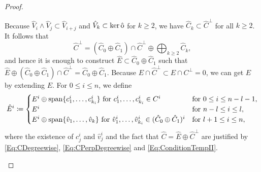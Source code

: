 \documentclass[\MainFolder/Text.tex]{subfiles}
\begin{document}
\begin{proof}
\begin{description}[leftmargin=0pt,font=\normalfont\itshape]
\item[Construction of $\hat{E}$:]
Because $\hat{V}_i \wedge \hat{V}_j \subset \hat{V}_{i+j}$ and $\hat{V}_k \subset \ker \hat{\mathrm{o}}$ for $k\ge 2$, we have $\hat{C}_k \subset \hat{C}^\perp$ for all $k\ge 2$.
It follows that 
\[
\hat{C}^\perp = (\hat{C}_0\oplus\hat{C}_1)\cap\hat{C}^\perp \oplus \bigoplus_{k\ge 2}\hat{C}_k,
\]
and hence it is enough to construct $\hat{E} \subset \hat{C}_0\oplus\hat{C}_1$ such that $\hat{E}\oplus (\hat{C}_0\oplus\hat{C}_1)\cap\hat{C}^\perp = \hat{C}_0\oplus\hat{C}_1$.
Because $E\cap \hat{C}^\perp \subset E \cap C^\perp = 0$, we can get $\hat{E}$ by extending $E$.
For $0\le i \le n$, we define
\begin{equation}\label{Eq:EDegreewise}
\hat{E}^i \coloneqq
	\begin{cases}
		E^i\oplus \mathrm{span}\{c_1^i,\dotsc, c_{k_i}^i\}\text{ for }c_1^i, \dotsc, c_{k_i}^i\in C^i & \text{for }0\le i \le n-l-1,\\
		E^i & \text{for }n-l\le i \le l,\\
		E^i\oplus\mathrm{span}\{\hat{v}_1,\dotsc,\hat{v}_k\}\text{ for }\hat{v}_1^i,\dotsc,\hat{v}_{k_i}^i\in(\hat{C}_0\oplus\hat{C}_1)^i & \text{for }l+1\le i \le n,
	\end{cases}
\end{equation}
where the existence of $c^i_j$ and $\hat{v}^i_j$ and the fact that $\hat{C} = \hat{E}\oplus\hat{C}^\perp$ are justified by \eqref{Eq:CDegreewise}, \eqref{Eq:CPerpDegreewise} and \eqref{Eq:ConditionTempII}.


\end{description}
\end{proof}
\end{document}
